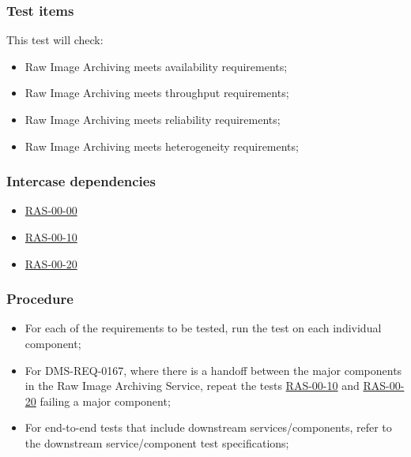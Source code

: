 \documentclass[DM,lsstdraft,STS,toc]{lsstdoc}
\begin{document}
\subsubsection{Test items}


This test will check:
\begin{itemize}
\item{Raw Image Archiving meets availability requirements;}
\item{Raw Image Archiving meets throughput requirements;}
\item{Raw Image Archiving meets reliability requirements;}
\item{Raw Image Archiving meets heterogeneity requirements;}
\end{itemize}

\subsubsection{Intercase dependencies}
\begin{itemize}
\item{\hyperref[ras-00-00]{RAS-00-00}}
\item{\hyperref[ras-00-00]{RAS-00-10}}
\item{\hyperref[ras-00-00]{RAS-00-20}}
\end{itemize}

\subsubsection{Procedure}
\begin{itemize}
\item{For each of the requirements to be tested, run the test on each individual component;}
\item{For DMS-REQ-0167, where there is a handoff between the major components in the Raw Image Archiving Service,
repeat the tests \hyperref[ras-00-00]{RAS-00-10} and \hyperref[ras-00-00]{RAS-00-20} failing a major component;}
\item{For end-to-end tests that include downstream services/components, refer to the downstream
service/component test specifications;}
\end{itemize}
\end{document}
